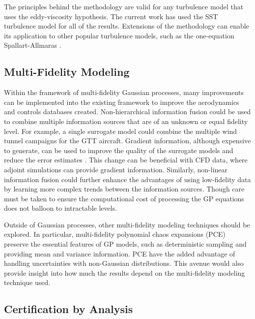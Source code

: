 The principles behind the methodology are valid for any turbulence model that uses the eddy-viscosity hypothesis. 
The current work has used the SST turbulence model for all of the results.
Extensions of the methodology can enable its application to other popular turbulence models, such as the one-equation Spallart-Allmaras \cite{allmaras2012modifications}. 

\subsection{Multi-Fidelity Modeling}

Within the framework of multi-fidelity Gaussian processes, many improvements can be implemented into the existing framework to improve the aerodynamics and controls databases created.
Non-hierarchical information fusion \cite{lam_multifidelity_2015} could be used to combine multiple information sources that are of an unknown or equal fidelity level. 
For example, a single surrogate model could combine the multiple wind tunnel campaigns for the GTT aircraft.
Gradient information, although expensive to generate, can be used to improve the quality of the surrogate models and reduce the error estimates \cite{han_improving_2013,yamazaki_derivative-enhanced_2013}.
This change can be beneficial with CFD data, where adjoint simulations can provide gradient information. 
Similarly, non-linear information fusion \cite{perdikaris_nonlinear_2017} could further enhance the advantages of using low-fidelity data by learning more complex trends between the information sources.
Though care must be taken to ensure the computational cost of processing the GP equations does not balloon to intractable levels.

Outside of Gaussian processes, other multi-fidelity modeling techniques should be explored. 
In particular, multi-fidelity polynomial chaos expansions (PCE) \cite{ng_multifidelity_2014} preserve the essential features of GP models, such as deterministic sampling and providing mean and variance information.
PCE have the added advantage of handling uncertainties with non-Gaussian distributions. 
This avenue would also provide insight into how much the results depend on the multi-fidelity modeling technique used. 

\subsection{Certification by Analysis}

